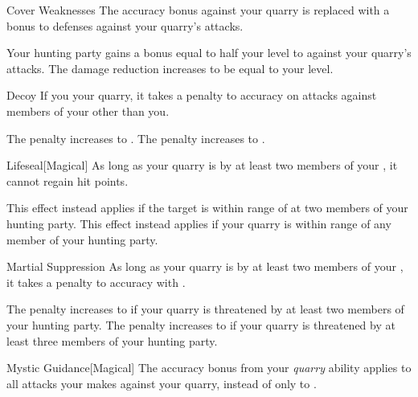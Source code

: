 {            \begin{freeability}{Cover Weaknesses}
                The accuracy bonus against your quarry is replaced with a  bonus to defenses against your quarry's attacks.

                \rankline
                 Your hunting party gains a bonus equal to half your level to  against your quarry's attacks.
                 The damage reduction increases to be equal to your level.
            \end{freeability}

            \begin{freeability}{Decoy}
                If you  your quarry, it takes a  penalty to accuracy on attacks against members of your  other than you.

                \rankline
                 The penalty increases to .
                 The penalty increases to .
            \end{freeability}

            \begin{freeability}{Lifeseal}[Magical]
                As long as your quarry is  by at least two members of your , it cannot regain hit points.

                \rankline
                 This effect instead applies if the target is within \rngmed range of at two members of your hunting party.
                 This effect instead applies if your quarry is within \rnglong range of any member of your hunting party.
            \end{freeability}

            \begin{freeability}{Martial Suppression}
                As long as your quarry is  by at least two members of your , it takes a  penalty to accuracy with .

                \rankline
                 The penalty increases to  if your quarry is threatened by at least two members of your hunting party.
                 The penalty increases to  if your quarry is threatened by at least three members of your hunting party.
            \end{freeability}

            \begin{freeability}{Mystic Guidance}[Magical]
                The accuracy bonus from your \textit{quarry} ability applies to all attacks your  makes against your quarry, instead of only to .


\end{freeability}}
